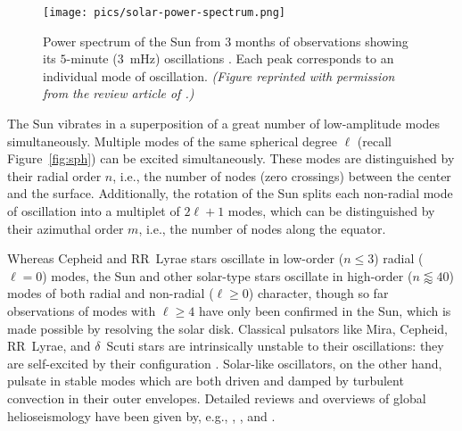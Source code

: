 \begin{figure}
    \centering
    \texttt{[image: pics/solar-power-spectrum.png]}
    \caption[Historical solar power spectrum]{Power spectrum of the Sun from $3$ months of observations showing its $5$-minute ($3$~mHz) oscillations \citep{1981SoPh...74...51C}. 
    Each peak corresponds to an individual mode of oscillation. 
    \emph{(Figure reprinted with permission from the review article of \citealt{1984ARA&A..22..593D}.)}
    \label{fig:solar-power-spectrum}}
\end{figure}


The Sun vibrates in a superposition of a great number of low-amplitude modes simultaneously. 
Multiple modes of the same spherical degree $\ell$ (recall Figure~\ref{fig:sph}) can be excited simultaneously. 
These modes are distinguished by their radial order $n$, i.e., the number of nodes (zero crossings) between the center and the surface. 
Additionally, the rotation of the Sun splits each non-radial mode of oscillation into a multiplet of ${2\ell+1}$ modes, which can be distinguished by their azimuthal order $m$, i.e., the number of nodes along the equator. 

Whereas Cepheid and RR~Lyrae stars oscillate in low-order (${n\leq 3}$) radial (${\ell = 0}$) modes, the Sun and other solar-type stars oscillate in high-order (${n\lessapprox 40}$) modes of both radial and non-radial (${\ell\geq 0}$) character, though so far observations of modes with $\ell \geq 4$ have only been confirmed in the Sun, which is made possible by resolving the solar disk. 
Classical pulsators like Mira, Cepheid, RR~Lyrae, and $\delta$~Scuti stars are intrinsically unstable to their oscillations: they are self-excited by their configuration \citep[e.g.,][]{2015EAS....73..111S}. 
Solar-like oscillators, on the other hand, pulsate in stable modes which are both driven and damped by turbulent convection in their outer envelopes. 
Detailed reviews and overviews of global helioseismology have been given by, e.g., \citet{2002RvMP...74.1073C}, \citet{Kosovichev1999,2011lnp...832....3k}, and \citet{2016lrsp...13....2b}. 

